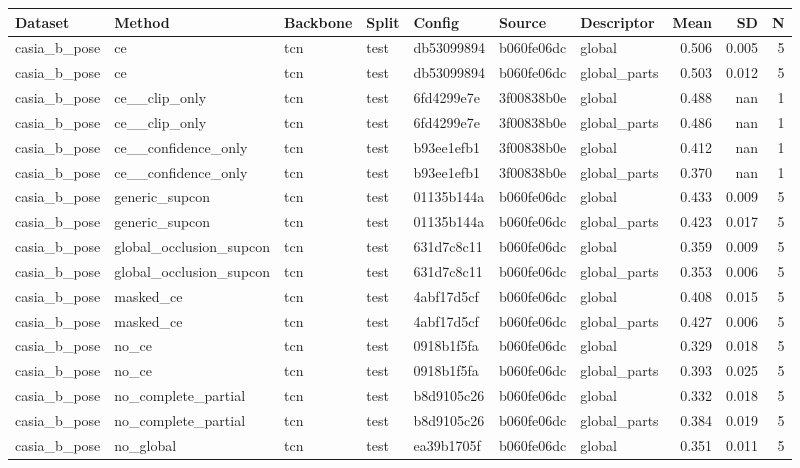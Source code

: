 \begin{tabular}{lllllllrrr}
Dataset & Method & Backbone & Split & Config & Source & Descriptor & Mean & SD & N \\
\hline
casia\_b\_pose & ce & tcn & test & db53099894 & b060fe06dc & global & 0.506 & 0.005 & 5 \\
casia\_b\_pose & ce & tcn & test & db53099894 & b060fe06dc & global\_parts & 0.503 & 0.012 & 5 \\
casia\_b\_pose & ce\_\_clip\_only & tcn & test & 6fd4299e7e & 3f00838b0e & global & 0.488 & nan & 1 \\
casia\_b\_pose & ce\_\_clip\_only & tcn & test & 6fd4299e7e & 3f00838b0e & global\_parts & 0.486 & nan & 1 \\
casia\_b\_pose & ce\_\_confidence\_only & tcn & test & b93ee1efb1 & 3f00838b0e & global & 0.412 & nan & 1 \\
casia\_b\_pose & ce\_\_confidence\_only & tcn & test & b93ee1efb1 & 3f00838b0e & global\_parts & 0.370 & nan & 1 \\
casia\_b\_pose & generic\_supcon & tcn & test & 01135b144a & b060fe06dc & global & 0.433 & 0.009 & 5 \\
casia\_b\_pose & generic\_supcon & tcn & test & 01135b144a & b060fe06dc & global\_parts & 0.423 & 0.017 & 5 \\
casia\_b\_pose & global\_occlusion\_supcon & tcn & test & 631d7c8c11 & b060fe06dc & global & 0.359 & 0.009 & 5 \\
casia\_b\_pose & global\_occlusion\_supcon & tcn & test & 631d7c8c11 & b060fe06dc & global\_parts & 0.353 & 0.006 & 5 \\
casia\_b\_pose & masked\_ce & tcn & test & 4abf17d5cf & b060fe06dc & global & 0.408 & 0.015 & 5 \\
casia\_b\_pose & masked\_ce & tcn & test & 4abf17d5cf & b060fe06dc & global\_parts & 0.427 & 0.006 & 5 \\
casia\_b\_pose & no\_ce & tcn & test & 0918b1f5fa & b060fe06dc & global & 0.329 & 0.018 & 5 \\
casia\_b\_pose & no\_ce & tcn & test & 0918b1f5fa & b060fe06dc & global\_parts & 0.393 & 0.025 & 5 \\
casia\_b\_pose & no\_complete\_partial & tcn & test & b8d9105c26 & b060fe06dc & global & 0.332 & 0.018 & 5 \\
casia\_b\_pose & no\_complete\_partial & tcn & test & b8d9105c26 & b060fe06dc & global\_parts & 0.384 & 0.019 & 5 \\
casia\_b\_pose & no\_global & tcn & test & ea39b1705f & b060fe06dc & global & 0.351 & 0.011 & 5 \\

\end{tabular}
